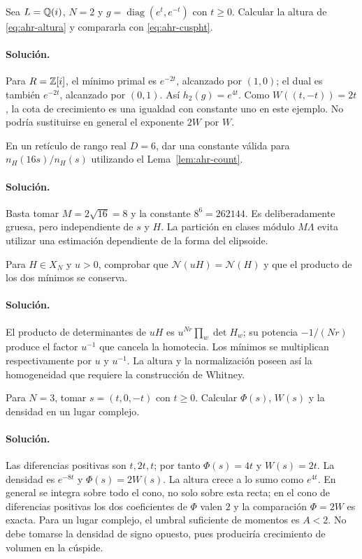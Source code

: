 \begin{ejercicio}
Sea $L=\mathbb{Q}(i)$, $N=2$ y $g=\operatorname{diag}(e^t,e^{-t})$ con $t\ge0$. Calcular la altura de \eqref{eq:ahr-altura} y compararla con \eqref{eq:ahr-cuspht}.
\end{ejercicio}
\paragraph{Solución.} Para $R=\mathbb{Z}[i]$, el mínimo primal es $e^{-2t}$, alcanzado por $(1,0)$; el dual es también $e^{-2t}$, alcanzado por $(0,1)$. Así $h_2(g)=e^{4t}$. Como $W((t,-t))=2t$, la cota de crecimiento es una igualdad con constante uno en este ejemplo. No podría sustituirse en general el exponente $2W$ por $W$.

\begin{ejercicio}
En un retículo de rango real $D=6$, dar una constante válida para $n_H(16s)/n_H(s)$ utilizando el Lema~\ref{lem:ahr-count}.
\end{ejercicio}
\paragraph{Solución.} Basta tomar $M=2\sqrt{16}=8$ y la constante $8^6=262144$. Es deliberadamente gruesa, pero independiente de $s$ y $H$. La partición en clases módulo $M\Lambda$ evita utilizar una estimación dependiente de la forma del elipsoide.

\begin{ejercicio}
Para $H\in X_N$ y $u>0$, comprobar que $\mathcal N(uH)=\mathcal N(H)$ y que el producto de los dos mínimos se conserva.
\end{ejercicio}
\paragraph{Solución.} El producto de determinantes de $uH$ es $u^{Nr}\prod_w\det H_w$; su potencia $-1/(Nr)$ produce el factor $u^{-1}$ que cancela la homotecia. Los mínimos se multiplican respectivamente por $u$ y $u^{-1}$. La altura y la normalización poseen así la homogeneidad que requiere la construcción de Whitney.

\begin{ejercicio}
Para $N=3$, tomar $s=(t,0,-t)$ con $t\ge0$. Calcular $\Phi(s)$, $W(s)$ y la densidad en un lugar complejo.
\end{ejercicio}
\paragraph{Solución.} Las diferencias positivas son $t,2t,t$; por tanto $\Phi(s)=4t$ y $W(s)=2t$. La densidad es $e^{-8t}$ y $\Phi(s)=2W(s)$. La altura crece a lo sumo como $e^{4t}$. En general se integra sobre todo el cono, no solo sobre esta recta; en el cono de diferencias positivas los dos coeficientes de $\Phi$ valen $2$ y la comparación $\Phi=2W$ es exacta. Para un lugar complejo, el umbral suficiente de momentos es $A<2$. No debe tomarse la densidad de signo opuesto, pues produciría crecimiento de volumen en la cúspide.

